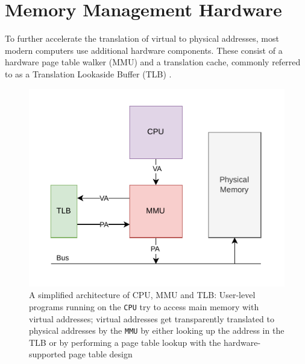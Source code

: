 


\cite{denning1970virtual} %
\section{Memory Management Hardware}
To further accelerate the translation of virtual to physical addresses, most modern computers use additional
hardware components. These consist of a hardware page table walker (MMU) and a translation cache,
commonly referred to as a Translation Lookaside Buffer (TLB) \cite{jacobVirtualMemoryContemporary1998}.

\begin{figure}[t]
    \centering
    \includegraphics[scale=1.2]{figures/simple_mmu_arch.pdf}
    \caption[A simplified architecture of CPU, MMU and TLB]{A simplified architecture of CPU, MMU and TLB:
        User-level programs running on the \texttt{CPU} try to access main memory with virtual
        addresses; virtual addresses get transparently translated to physical addresses by the
        \texttt{MMU} by either looking up the address in the TLB or by performing a page table
        lookup with the hardware-supported page table design}
    \label{fig:fund:simplearch}
\end{figure}


